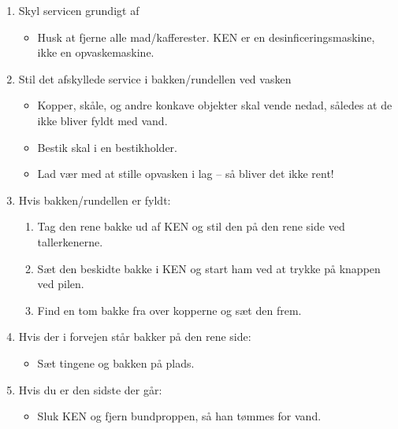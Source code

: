 

\begin{enumerate}

\bfseries \item Skyl servicen grundigt af \normalfont

  \begin{itemize}

  \item Husk at fjerne alle mad/kafferester.  KEN er en
    desinficeringsmaskine, ikke en opvaskemaskine.

  \end{itemize}

\bfseries \item Stil det afskyllede service i bakken/rundellen ved vasken
\normalfont

  \begin{itemize}

  \item Kopper, skåle, og andre konkave objekter skal vende nedad,
    således at de ikke bliver fyldt med vand.

  \item Bestik skal i en bestikholder.

  \item Lad vær med at stille opvasken i lag -- så bliver det ikke rent!

  \end{itemize}

\bfseries \item Hvis bakken/rundellen er fyldt: \normalfont
  \begin{enumerate}

  \item Tag den rene bakke ud af KEN og stil den på den rene side ved
    tallerkenerne.

  \item Sæt den beskidte bakke i KEN og start ham ved at trykke på
    knappen ved pilen.

  \item Find en tom bakke fra over kopperne og sæt den frem.

  \end{enumerate}

\bfseries \item Hvis der i forvejen står bakker på den rene side: \normalfont

  \begin{itemize}

  \item Sæt tingene og bakken på plads.

  \end{itemize}

\bfseries \item Hvis du er den sidste der går: \normalfont

  \begin{itemize}

  \item Sluk KEN og fjern bundproppen, så han tømmes for vand.

  \end{itemize}

\end{enumerate}

